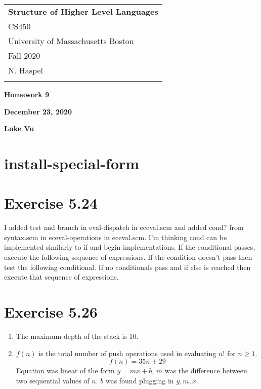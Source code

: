 \documentclass[a4paper,12pt]{article}
\begin{document}
	\thispagestyle{empty}

	\begin{tabular}{p{15.5cm}}
		{\large \bf Structure of Higher Level Languages} \\ CS450 \\
		University of Massachusetts Boston \\ Fall 2020  \\ N. Haspel\\
		\hline
		\\
	\end{tabular}

	\vspace*{0.1cm}

	\begin{center}
		{\Large \bf Homework 9}
		\vspace{1mm}

		{\bf December 23, 2020}
		\vspace{1mm}

		{\bf Luke Vu}
	\end{center}

	\vspace*{0.5cm}

\section{install-special-form}
\section{Exercise 5.24}
I added test and branch in eval-dispatch in eceval.scm and
added cond? from syntax.scm in eceval-operations in eceval.scm.
I'm thinking cond can be implemented similarly to if and begin implementations. If the conditional passes, execute the following sequence of expressions. If the condition doesn't pass then test the following conditional. If no conditionals pass and if else is reached then execute that sequence of expressions.


\section{Exercise 5.26}
\begin{enumerate}[label=\alph*]
\item The maximum-depth of the stack is 10.
\item $f(n)$ is the total number of push operations used in evaluating $n!$ for $n\geq 1$. $$f(n) = 35n + 29$$
Equation was linear of the form $y=mx + b$, $m$ was the difference between two sequential values of $n$. $b$ was found plugging in $y, m, x$.
\end{enumerate}
\end{document}
